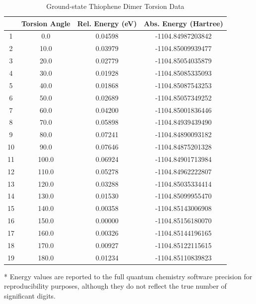 \begin{table}[hbt!]\centering
\caption{Ground-state Thiophene Dimer Torsion Data}
\renewcommand{\arraystretch}{1.5}
\begin{threeparttable}
\begin{tabular}{cccc}\toprule
  {} & {Torsion Angle} & {Rel. Energy (eV)} & {Abs. Energy (Hartree)} \\ \midrule
    1 & 0.0 & 0.04598 & -1104.84987203842\\
    2 & 10.0 & 0.03979 & -1104.85009939477\\
    3 & 20.0 & 0.02779 & -1104.85054035879\\
    4 & 30.0 & 0.01928 & -1104.85085335093\\
    5 & 40.0 & 0.01868 & -1104.85087543253\\
    6 & 50.0 & 0.02689 & -1104.85057349252\\
    7 & 60.0 & 0.04200  & -1104.85001836446\\
    8 & 70.0 & 0.05898 & -1104.84939439490\\
    9 & 80.0 & 0.07241 & -1104.84890093182\\
    10 & 90.0 & 0.07646 & -1104.84875201328\\
    11 & 100.0 & 0.06924 & -1104.84901713984\\
    12 & 110.0 & 0.05278 & -1104.84962222807\\
    13 & 120.0 & 0.03288 & -1104.85035334414\\
    14 & 130.0 & 0.01530 & -1104.85099955470\\
    15 & 140.0 & 0.00358 & -1104.85143006908\\
    16 & 150.0 & 0.00000 & -1104.85156180070\\
    17 & 160.0 & 0.00326 & -1104.85144196165\\
    18 & 170.0 & 0.00927 & -1104.85122115615\\
    19 & 180.0 & 0.01234 & -1104.85110839823\\ \bottomrule
\end{tabular}
\begin{tablenotes}
\item[*] \footnotesize Energy values are reported to the full quantum chemistry software precision for reproducibility purposes, although they do not reflect the true number of significant digits.
\end{tablenotes}
\end{threeparttable}
\end{table}

